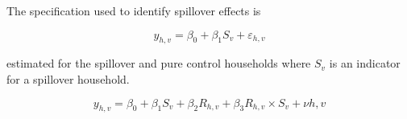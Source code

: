 \documentclass[11pt]{article}
\begin{document}
The specification used to identify spillover effects is

\[ y_{h,v} = \beta_0 + \beta_1 S_v + \varepsilon_{h,v} \]

estimated for the spillover and pure control households where $S_v$ is an indicator for a spillover household.

\[ y_{h,v} = \beta_0 + \beta_1 S_v + \beta_2 R_{h,v} + \beta_3 R_{h,v} \times S_v + \nu{h,v} \]

\printbibliography
\end{document}
